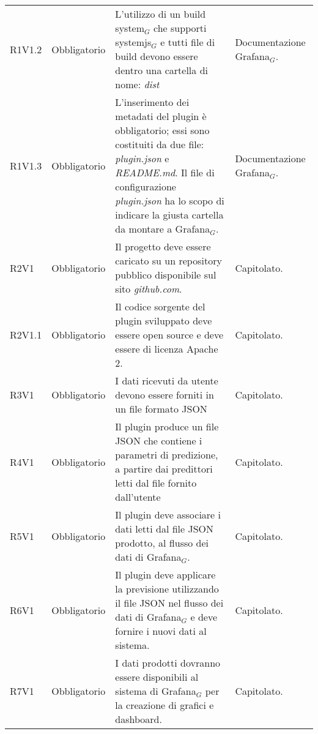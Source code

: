 \documentclass[12pt,a4paper]{article} %
\newcommand\Tstrut{\rule{0pt}{2.6ex}} %
\newcommand\Bstrut{\rule[-0.9ex]{0pt}{0pt}} %
\newcommand{\TBstrut}{\Tstrut\Bstrut} %
\newcommand{\glo}{$_G$} %
\newcommand{\glosp}{$_G$ } %
\begin{document}
\begin{longtable} {
		>{\centering}p{18mm} 
		>{\centering}p{28mm}
		>{}p{50mm} 
		>{}p{28mm}
		}
		R1V1.2 & 
		Obbligatorio & 
		L'utilizzo di un build system\glosp che supporti systemjs\glosp e tutti file di build devono essere dentro una cartella di nome: \textit{dist} &
		Documentazione Grafana\glo.  \TBstrut \\ [2mm]

		R1V1.3 & 
		Obbligatorio & 
		L'inserimento dei metadati del plugin è obbligatorio; essi sono costituiti da due file: \textit{plugin.json} e \textit{README.md}. Il file di configurazione \textit{plugin.json} ha lo scopo di indicare la giusta cartella da montare a Grafana\glo . &
		Documentazione Grafana\glo.  \TBstrut \\ [2mm]
		
		R2V1 & 
		Obbligatorio & 
		Il progetto deve essere caricato su un repository pubblico disponibile sul sito \textit{github.com}. &
		Capitolato.  \TBstrut \\ [2mm]
		
		R2V1.1 & 
		Obbligatorio & 
		Il codice sorgente del plugin sviluppato deve essere open source e deve essere di licenza Apache 2.  &
		Capitolato.  \TBstrut \\ [2mm]
		
		R3V1 &
		Obbligatorio &
		I dati ricevuti da utente devono essere forniti in un file formato JSON  &
		Capitolato.  \TBstrut \\ [2mm]
		
		R4V1 &
		Obbligatorio &
		Il plugin produce un file JSON che contiene i parametri di predizione, a partire dai predittori letti dal file fornito dall'utente  &
		Capitolato.  \TBstrut \\ [2mm]
		
		R5V1 &
		Obbligatorio &
		Il plugin deve associare i dati letti dal file JSON prodotto, al flusso dei dati di Grafana\glo .  &
		Capitolato.  \TBstrut \\ [2mm]
		
		R6V1 &
		Obbligatorio &
		Il plugin deve applicare la previsione utilizzando il file JSON nel flusso dei dati di Grafana\glosp e deve fornire i nuovi dati al sistema.  &
		Capitolato.  \TBstrut \\ [2mm]
		
		R7V1 &
		Obbligatorio &
		I dati prodotti dovranno essere disponibili al sistema di Grafana\glosp per la creazione di grafici e dashboard.  &
		Capitolato.  \TBstrut \\ [2mm]
		
	\end{longtable}
	
\end{document}
